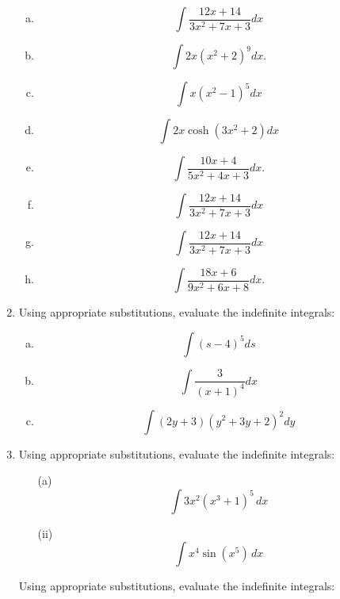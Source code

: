 \documentclass[a4paper,12pt]{article}
\begin{document}
\begin{enumerate}
\begin{multicols}{2}
\begin{enumerate}[(a)]
\item \[ \int \frac{12x + 14}{3x^2 + 7x + 3} dx\]
	  \item   	\[ \int 2x(x^2 + 2)^9 dx.\]
	\item \[ \int x(x^2 - 1)^5 dx\]
	\item\[ \int 2x \cosh(3x^2+2) dx \]
\item   \[ \int \frac{10x + 4}{5x^2 + 4x + 3} dx.\]
	
	\item  \[ \int \frac{12x + 14}{3x^2 + 7x + 3} dx\]
\item \[ \int \frac{12x + 14}{3x^2 + 7x + 3} dx\]
\item \[ \int \frac{18x + 6}{9x^2 + 6x + 8} dx.\]
\end{enumerate}
\end{multicols}
\item Using appropriate substitutions, evaluate the indefinite integrals:

\begin{multicols}{2}
	\begin{enumerate}[(a)]
		
		\item 
		\[ \int (s - 4)^5 ds \]
		\item 
		\[ \int 
		\frac{3}{(x + 1)^4 }dx\]
		\item 
		\[\int 
		(2y + 3)(y^2 + 3y + 2)^2 dy\]
		
	\end{enumerate}
\end{multicols}

\item 
Using appropriate substitutions, evaluate the indefinite integrals:
\begin{multicols}{2}
	\begin{itemize}
		
		\item[(a)]	
		\[\int 3x^2 (x^3+1)^5 \, dx\]
		
		\item[(ii)]
		\[\int x^4 \sin(x^5) \, dx\]
	\end{itemize}
\end{multicols}


Using appropriate substitutions, evaluate the indefinite integrals:

\begin{multicols}{2}
	\begin{enumerate}[(a)]
		

\end{enumerate}
\end{multicols}
\end{enumerate}
\end{document}
